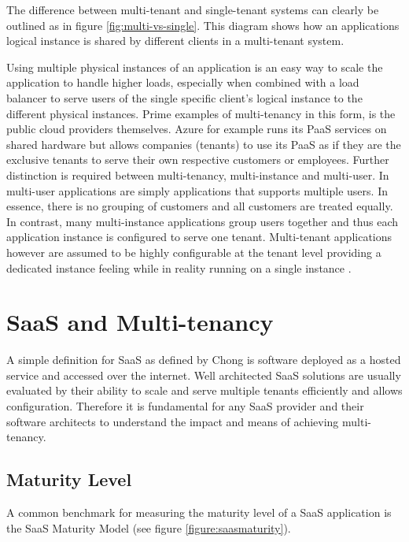 The difference between multi-tenant and single-tenant systems can clearly be outlined as in figure \ref{fig:multi-vs-single}. This diagram shows how an applications logical instance is shared by different clients in a multi-tenant system.


Using multiple physical instances of an application is an easy way to scale the application to handle higher loads, especially when combined with a load balancer to serve users of the single specific client's logical instance to the different physical instances. Prime examples of multi-tenancy in this form, is the public cloud providers themselves. Azure for example runs its PaaS services on shared hardware but allows companies (tenants) to use its PaaS as if they are the exclusive tenants to serve their own respective customers or employees.
Further distinction is required between multi-tenancy, multi-instance and multi-user. In multi-user applications are simply applications that supports multiple users. In essence, there is no grouping of customers and all customers are treated equally\cite{Bezemer:2010:MSA:1862372.1862393}. In contrast, many multi-instance applications group users together and thus each application instance is configured to serve one tenant. Multi-tenant applications however are assumed to be highly configurable at the tenant level providing a dedicated instance feeling while in reality running on a single instance \cite{Bezemer:2010:MSA:1862372.1862393}.

\section{SaaS and Multi-tenancy}

A simple definition for SaaS as defined by Chong \cite{Chong2006} is software deployed as a hosted service and accessed over the internet. Well architected SaaS solutions are usually evaluated by their ability to scale and serve multiple tenants efficiently and allows configuration. Therefore it is fundamental for any SaaS provider and their software architects to understand the impact and means of achieving multi-tenancy.

\subsection{Maturity Level}

A common benchmark for measuring the maturity level of a SaaS application is the SaaS Maturity Model (see figure \ref{figure:saasmaturity}).

